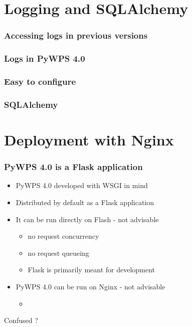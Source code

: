 \documentclass{beamer}
\begin{document}
\section*{Logging and SQLAlchemy}

\begin{frame}
\frametitle<presentation>{Accessing logs in previous versions}

\end{frame}

\begin{frame}
\frametitle<presentation>{Logs in PyWPS 4.0}

\end{frame}

\begin{frame}
\frametitle<presentation>{Easy to configure}

\end{frame}


\begin{frame}
\frametitle<presentation>{SQLAlchemy}

\end{frame}


\section*{Deployment with Nginx}


\begin{frame}
\frametitle<presentation>{PyWPS 4.0 is a Flask application}

\begin{itemize}
  \item PyWPS 4.0 developed with WSGI in mind
  \item Distributed by default as a Flask application
  \item It can be run directly on Flash - not advisable
  \begin{itemize}
    \item no request concurrency
    \item no request queueing
    \item Flask is primarily meant for development
  \end{itemize}
  \item PyWPS 4.0 can be run on Nginx - not advisable
  \begin{itemize}
    \item 
  \end{itemize} 
\end{itemize}

\huge{Confused ?}

\end{frame}
\end{document}
